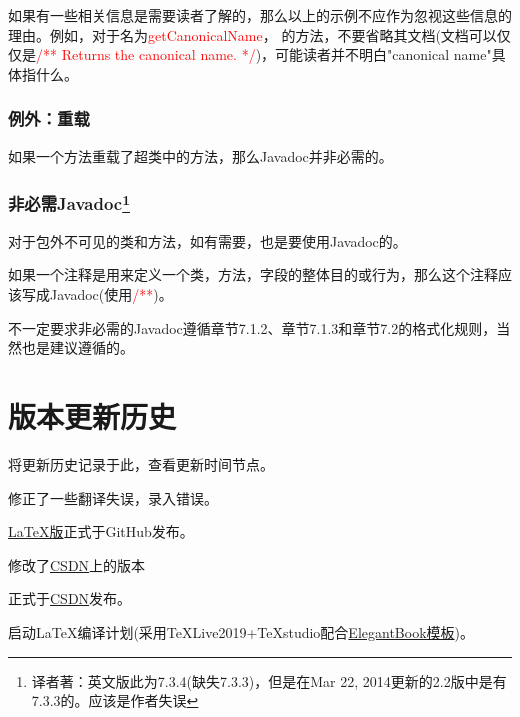 \documentclass[cn,11pt,chinese]{elegantbook}
\begin{document}
\begin{note}
	如果有一些相关信息是需要读者了解的，那么以上的示例不应作为忽视这些信息的理由。例如，对于名为\textcolor{red}{getCanonicalName}， 的方法，不要省略其文档(文档可以仅仅是\textcolor{red}{/** Returns the canonical name. */})，可能读者并不明白"canonical name"具体指什么。
\end{note}

\subsection{例外：重载}
如果一个方法重载了超类中的方法，那么Javadoc并非必需的。

\subsection{非必需Javadoc\footnote{译者著：英文版此为7.3.4(缺失7.3.3)，但是在Mar 22, 2014更新的2.2版中是有7.3.3的。应该是作者失误}}
对于包外不可见的类和方法，如有需要，也是要使用Javadoc的。

如果一个注释是用来定义一个类，方法，字段的整体目的或行为，那么这个注释应该写成Javadoc(使用\textcolor{red}{/**})。

不一定要求非必需的Javadoc遵循章节7.1.2、章节7.1.3和章节7.2的格式化规则，当然也是建议遵循的。

\chapter{版本更新历史}
将更新历史记录于此，查看更新时间节点。

\begin{change}
	\item 修正了一些翻译失误，录入错误。
	\item \href{https://github.com/TYZQ/Google-Java-Style-Guide-cn}{\LaTeX 版}正式于GitHub发布。
	\item 修改了\href{https://blog.csdn.net/weixin_43395262/article/details/105682415}{CSDN}上的版本

\end{change}

\begin{change}
	\item 正式于\href{https://blog.csdn.net/weixin_43395262/article/details/105682415}{CSDN}发布。
	\item 启动\LaTeX 编译计划(采用\TeX Live2019+\TeX studio配合\href{https://github.com/ElegantLaTeX/ElegantBook}{ElegantBook模板})。
\end{change}
\end{document}
